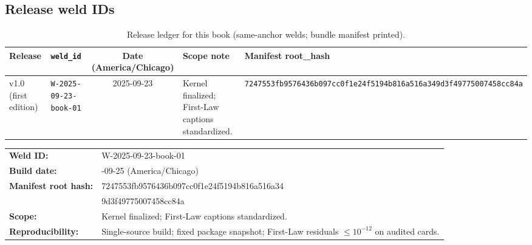 \subsection*{Release weld IDs}
\begin{table}[h]
  \centering
  \caption{Release ledger for this book (same-anchor welds; bundle manifest printed).}
  \label{tab:book-welds}
  \begingroup
  \footnotesize
  \setlength{\tabcolsep}{3.5pt}
  \renewcommand{\arraystretch}{1.06}
  \def\UrlBreaks{\do\0\do\1\do\2\do\3\do\4\do\5\do\6\do\7\do\8\do\9%
    \do\a\do\b\do\c\do\d\do\e\do\f}
  \begin{tabularx}{\linewidth}{@{} l l c >{\raggedright\arraybackslash}X >{\ttfamily\footnotesize\raggedright\arraybackslash}X @{}}
    \toprule
    Release & \texttt{weld\_id} & Date (America/Chicago) & Scope note & Manifest root\_hash \\
    \midrule
    v1.0 (first edition)
      & \texttt{W-2025-09-23-book-01}
      & 2025-09-23
      & Kernel finalized; First-Law captions standardized.
      & \nolinkurl{7247553fb9576436b097cc0f1e24f5194b816a516a349d3f49775007458cc84a} \\
    \bottomrule
  \end{tabularx}
  \endgroup
\end{table}



\begin{eqbox}
\small
\begin{tabularx}{\linewidth}{@{}>{\bfseries}l >{\ttfamily}X@{}}
\textbf{Weld ID:}            & W-2025-09-23-book-01 \\
\textbf{Build date:}         & 2025-09-25 (America/Chicago) \\
\textbf{Manifest root hash:} & 7247553fb9576436b097cc0f1e24f5194b816a516a34\\
                             & 9d3f49775007458cc84a \\
\textbf{Scope:}              & Kernel finalized; First-Law captions standardized. \\
\textbf{Reproducibility:}    & Single-source build; fixed package snapshot; First-Law residuals $\le 10^{-12}$ on audited cards.\\
\end{tabularx}
\end{eqbox}


